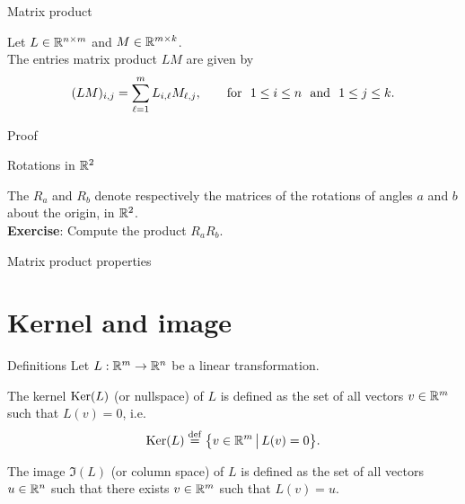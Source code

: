 \documentclass{beamer}
\begin{document}
\begin{frame}[t]{Matrix product}
	\grid
	\vspace{-0.3cm}
	\begin{theorem}
	Let $L \in \mathbb{R}^{n \times m}$ and $M \in \mathbb{R}^{m \times k}$. 
	\\
		The entries matrix product $LM$ are given by
		\vspace{-0.2cm}
		$$
		(LM)_{i,j} 
		=\sum_{\ell = 1}^m L_{i,\ell} M_{\ell,j}, \qquad \text{for} \ \  1 \leq i \leq n \ \ \text{and} \ \ 1 \leq j \leq k.
		\vspace{-0.2cm}
		$$
	\end{theorem}
\end{frame}
\begin{frame}[t]{Proof}
	\grid
\end{frame}
\begin{frame}[t]{Rotations in $\mathbb{R}^2$}
	\grid

	\vspace{-0.25cm}
	The $R_{a}$ and $R_{b}$ denote respectively the matrices of the rotations of angles $a$ and $b$ about the origin, in $\mathbb{R}^2$.
	\\
	\vspace{0.3cm}
	\textbf{Exercise}:
	Compute the product $R_a R_b$.

\end{frame}
\begin{frame}[t]{Matrix product properties}
	\grid

\end{frame}

\section{Kernel and image}

\begin{frame}[t]{Definitions}
	Let \quad $L: \mathbb{R}^m \to \mathbb{R}^n$ \quad be a linear transformation.
	\begin{definition}[Kernel]
		The kernel ${{\rm Ker}}(L)$ (or nullspace) of $L$ is defined as the set of all vectors $v \in \mathbb{R}^m$ such that $L(v) = 0$, i.e.
		$$
		{{\rm Ker}}(L) \overset{\rm def}{=} \big\{ v \in \mathbb{R}^m \, \big| \, L(v) = 0 \big\}.
		$$
	\end{definition}

	\begin{definition}[Image]
		The image $\Im(L)$ (or column space) of $L$ is defined as the set of all vectors $u \in \mathbb{R}^n$ such that there exists $v \in \mathbb{R}^m$ such that $L(v) = u$. 
	\end{definition}
\end{frame}
\end{document}
